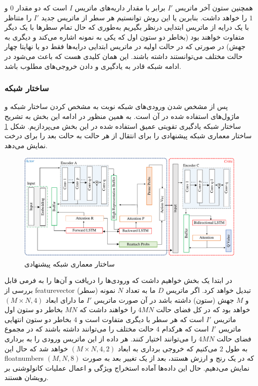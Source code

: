 همچنین ستون آخر ماتریس $I'$ برابر با مقدار داریه‌های ماتریس $I$ است که دو مقدار $0$ و $1$ را خواهد داشت. بنابرین یا این روش توانستیم هر سطر از ماتریس جدید $I'$ را متناظر با یک درایه از ماتریس ابتدایی درنظر بگیریم به‌طوری که حال تمام سطرها با یک دیگر متفاوت خواهند بود (بخاطر دو ستون اول که یکی به نمونه اشاره می‌کند و دیگری به جهش) در صورتی که در حالت اولیه در ماتریس ابتدایی درایه‌ها فقط دو یا نهایتا چهار حالت مختلف می‌توانستند داشته باشند. این همان کلیدی هست که باعث می‌شود در ادامه شبکه قادر به یادگیری و دادن خروجی‌های مطلوب باشد.

\subsubsection{ساختار شبکه}
پس از مشخص شدن ورودی‌های شبکه نوبت به مشخص کردن ساختار شبکه و ماژول‌های استفاده شده در آن است. به همین منظور در ادامه این بخش به تشریح ساختار شبکه یادگیری تقویتی عمیق استفاده شده در این بخش می‌پردازیم.
شکل \ref{fig:ch_pm:main_network} ساختار معماری شبکه پیشنهادی را برای انتقال از هر حالت به حالت بعد را برای درخت نمایش می‌دهد.
\\
\begin{figure}[!ht]
	\centering 
	\includegraphics[width=1.002\textwidth]{img/chaps/pm/network}
	\caption{ساختار معماری شبکه پیشنهادی}    
	\label{fig:ch_pm:main_network}
\end{figure}
در ابتدا یک بخش  خواهیم داشت که ورودی‌ها را دریافت و آن‌ها را به فرمی قابل بررسی از \gls{featurevector} تبدیل خواهد کرد.
اگر ماتریس $D$ ما به تعداد $N$ نمونه (سطر) و $M$ جهش (ستون) داشته باشد در آن صورت ماتریس $I'$ ما دارای ابعاد $(M\times N, 4)$ خواهد بود که در کل فضای حالت $4MN$ را خواهند داشت که $MN$ بخاطر دو ستون اول ماتریس $I'$ است که هر سطر با دیگری متفاوت است و $4$ بخاطر دو ستون انتهایی ماتریس $I'$ است که هرکدام $4$ حالت مختلف را می‌توانند داشته باشند که در مجموع فضای حالت $4MN$ را می‌توانند اختیار کنند. هر داده از این ماتریس ورودی را به برداری به طول $2$  می‌کنیم که خروجی برداری به ابعاد $(M\times N, 4, 2)$ خواهد شد که حال این  \glspl{floatnumber} که در یک رنج و ارزش هستند، بعد از یک تغییر بعد به صورت $(M, N, 8)$ نمایش می‌دهیم. حال این داده‌ها آماده استخراج ویژگی و اعمال عملیات کانولوشنی بر رویشان هستند. 
